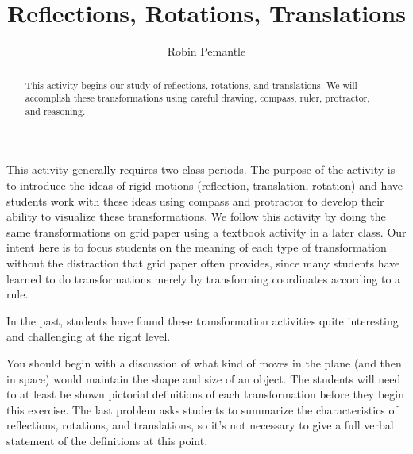 \documentclass[handout]{ximera}
\title{Reflections, Rotations, Translations}
\author{Robin Pemantle}
\begin{document}
\begin{abstract}This activity begins our study of reflections, rotations, and translations.  We will accomplish these transformations using careful drawing, compass, ruler, protractor, and reasoning.
\end{abstract}
\maketitle

\begin{instructorIntro}
This activity generally requires two class periods.  The purpose of the activity is to  introduce the ideas of rigid motions (reflection, translation, rotation) and have students work with these ideas using compass and protractor to develop their ability to visualize these transformations.  We follow this activity by doing the same transformations on grid paper using a textbook activity in a later class.  Our intent here is to focus students on the meaning of each type of transformation without the distraction that grid paper often provides, since many students have learned to do transformations merely by transforming coordinates according to a rule.

In the past, students have found these transformation activities quite interesting and challenging at the right level.

You should begin with a discussion of what kind of moves in the plane (and then in space) would maintain the shape and size of an object. The students will need to at least be shown pictorial definitions of each transformation before they begin this exercise.  The last problem asks students to summarize the characteristics of reflections, rotations, and translations, so it's not necessary to give a full verbal statement of the definitions at this point.  


\end{instructorIntro}
\end{document}

